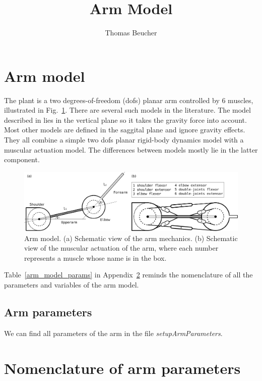 \documentclass[pdftex,a4paper,11pt]{article}
\begin{document}
\title{Arm Model}
\author{Thomas Beucher}
\maketitle

\section{Arm model}

The plant is a two degrees-of-freedom (dofs) planar arm controlled by 6 muscles, illustrated in Fig.~\ref{fig:arm_model}.
There are several such models in the literature. The model described in \cite{Kambara2009} lies in the vertical
plane so it takes the gravity force into account. Most other models are defined in the saggital plane and
ignore gravity effects. They all combine a simple two dofs planar rigid-body dynamics model with a 
muscular actuation model. The differences between models mostly lie in the latter component.

\begin{figure}[hbt]
\centering
	\includegraphics[width=0.9\columnwidth]{figures/arm_model_horiz.pdf}
	\caption{Arm model. (a) Schematic view of the arm mechanics. (b) Schematic view of the muscular actuation of the arm, where each number represents a muscle whose name is in the box.}
	\label{fig:arm_model}
\end{figure}

Table~\ref{arm_model_params} in Appendix~\ref{sec:params} reminds the nomenclature of all the parameters and variables of the arm model. 

\subsection{Arm parameters}
\label{sec:arm_parameters}
We can find all parameters of the arm in the file \textit{setupArmParameters}.


\appendix
\section{Nomenclature of arm parameters}
\label{sec:params}
\end{document}
